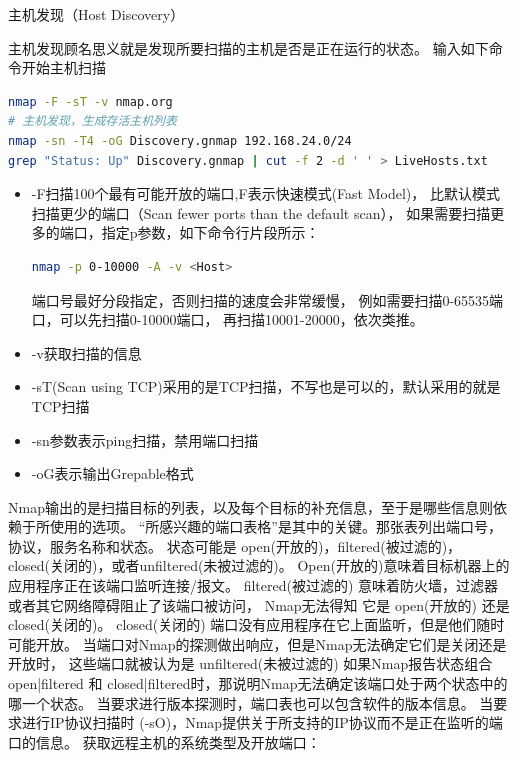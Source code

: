 \documentclass[11pt,fleqn]{book}
\makeatletter
\numberwithin{dummy}{section}
\theoremstyle{ocrenumbox}
\theoremstyle{blacknumex}
\theoremstyle{blacknumbox}
\theoremstyle{ocrenum}
\renewcommand{\subsection}{\@startsection {subsection}{2}{\z@}
	{-3ex \@plus -0.1ex \@minus -.4ex}
	{0.5ex \@plus.2ex }
	{\normalfont\sffamily\bfseries}}
\makeatother
\begin{document}
\subsection{主机发现（Host Discovery）}

主机发现顾名思义就是发现所要扫描的主机是否是正在运行的状态。
输入如下命令开始主机扫描

\begin{lstlisting}[language=Bash]
nmap -F -sT -v nmap.org
# 主机发现，生成存活主机列表
nmap -sn -T4 -oG Discovery.gnmap 192.168.24.0/24
grep "Status: Up" Discovery.gnmap | cut -f 2 -d ' ' > LiveHosts.txt
\end{lstlisting}

\begin{itemize}
	\item{-F}扫描100个最有可能开放的端口,F表示快速模式(Fast Model)，
	比默认模式扫描更少的端口（Scan fewer ports than the default scan），
	如果需要扫描更多的端口，指定p参数，如下命令行片段所示：
	
	\begin{lstlisting}[language=Bash]
	nmap -p 0-10000 -A -v <Host>
	\end{lstlisting}
	
	端口号最好分段指定，否则扫描的速度会非常缓慢，
	例如需要扫描0-65535端口，可以先扫描0-10000端口，
	再扫描10001-20000，依次类推。
	
	\item{-v}获取扫描的信息
	\item{-sT(Scan using TCP)}采用的是TCP扫描，不写也是可以的，默认采用的就是TCP扫描
	\item{-sn参数表示ping扫描，禁用端口扫描}
	\item{-oG表示输出Grepable格式}
\end{itemize}

Nmap输出的是扫描目标的列表，以及每个目标的补充信息，至于是哪些信息则依赖于所使用的选项。
“所感兴趣的端口表格”是其中的关键。那张表列出端口号，协议，服务名称和状态。
状态可能是 open(开放的)，filtered(被过滤的)， closed(关闭的)，或者unfiltered(未被过滤的)。
Open(开放的)意味着目标机器上的应用程序正在该端口监听连接/报文。 
filtered(被过滤的) 意味着防火墙，过滤器或者其它网络障碍阻止了该端口被访问，
Nmap无法得知 它是 open(开放的) 还是 closed(关闭的)。 
closed(关闭的) 端口没有应用程序在它上面监听，但是他们随时可能开放。 
当端口对Nmap的探测做出响应，但是Nmap无法确定它们是关闭还是开放时，
这些端口就被认为是 unfiltered(未被过滤的) 如果Nmap报告状态组合 
open|filtered 和 closed|filtered时，那说明Nmap无法确定该端口处于两个状态中的哪一个状态。
当要求进行版本探测时，端口表也可以包含软件的版本信息。
当要求进行IP协议扫描时 (-sO)，Nmap提供关于所支持的IP协议而不是正在监听的端口的信息。
获取远程主机的系统类型及开放端口：
\end{document}
